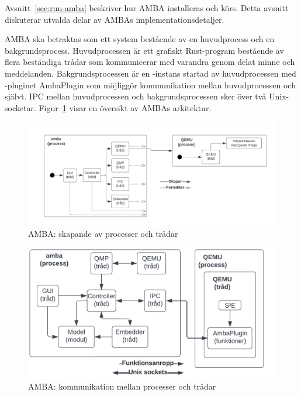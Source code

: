 Avsnitt~\ref{sec:run-amba} beskriver hur AMBA installeras och körs. Detta
avsnitt diskuterar utvalda delar av AMBAs implementationsdetaljer.

AMBA ska betraktas som ett system bestående av en huvudprocess och en
bakgrundsprocess. Huvudprocessen är ett grafiskt Rust-program bestående av flera
beständiga trådar som kommunicerar med varandra genom delat minne och
meddelanden. Bakgrundsprocessen är en \stoe{}-instans startad av huvudprocessen
med \stoe{}-pluginet AmbaPlugin som möjliggör kommunikation mellan
huvudprocessen och \stoe{} självt. IPC mellan huvudprocessen och
bakgrundsprocessen sker över två Unix-socketar. Figur~\ref{fig:arkitektur} visar
en översikt av AMBAs arkitektur.

\begin{figure}[h]
    \centering
    \includegraphics[width=\textwidth]{figures/arch-process-threads.png}
    \caption{AMBA: skapande av processer och trådar}\label{fig:arkitektur}
\end{figure}

\begin{figure}[h]
    \centering
    \includegraphics[width=\textwidth]{figures/arch-communication.png}
    \caption{AMBA: kommunikation mellan processer och trådar}\label{fig:arkitektur-kommunikation}
\end{figure}


